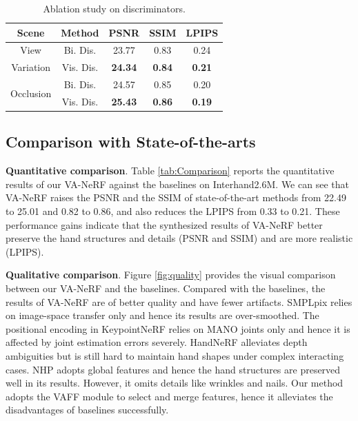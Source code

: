 \documentclass[letterpaper]{article}
\begin{document}
\begin{table}[t]
\centering
\caption{Ablation study on discriminators.}
\label{tab:disc}
\begin{adjustbox}{width=0.19\columnwidth}
\begin{tabular}{ccccc}
\toprule
Scene  & Method & PSNR    & SSIM    & LPIPS     \\
\midrule
View & Bi. Dis. &  23.77  &  0.83  &  0.24  \\ \cline{2-5}
Variation & Vis. Dis.  &  \textbf{24.34}  &  \textbf{0.84}   &  \textbf{0.21}     \\ \hline
\multirow[c]{2}{*}{Occlusion} & Bi. Dis. &  24.57  &  0.85  &  0.20  \\ \cline{2-5}
 & Vis. Dis.  &  \textbf{25.43}   &  \textbf{0.86}  &  \textbf{0.19}    \\
\bottomrule
\end{tabular}
\end{adjustbox}
\end{table}



\subsection{Comparison with State-of-the-arts}

\textbf{Quantitative comparison}. Table \ref{tab:Comparison} reports the quantitative results of our VA-NeRF against the baselines on Interhand2.6M. We can see that VA-NeRF raises the PSNR and the SSIM of state-of-the-art methods from 22.49 to 25.01 and 0.82 to 0.86, and also reduces the LPIPS from 0.33 to 0.21. These performance gains indicate that the synthesized results of VA-NeRF better preserve the hand structures and details (PSNR and SSIM) and are more realistic (LPIPS).

\noindent\textbf{Qualitative comparison}. Figure \ref{fig:quality} provides the visual comparison between our VA-NeRF and the baselines. Compared with the baselines, the results of VA-NeRF are of better quality and have fewer artifacts. SMPLpix relies on image-space transfer only and hence its results are over-smoothed. The positional encoding in KeypointNeRF relies on MANO joints only and hence it is affected by joint estimation errors severely. HandNeRF alleviates depth ambiguities but is still hard to maintain hand shapes under complex interacting cases. NHP adopts global features and hence the hand structures are preserved well in its results. However, it omits details like wrinkles and nails. Our method adopts the VAFF module to select and merge features, hence it alleviates the disadvantages of baselines successfully.
\end{document}
